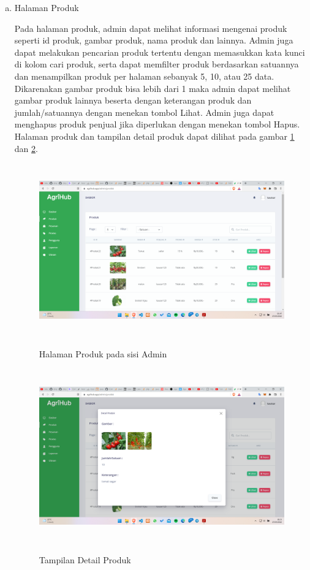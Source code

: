 \begin{enumerate}
\begin{enumerate}[a.]
		\item Halaman Produk
		\par Pada halaman produk, admin dapat melihat informasi mengenai produk seperti id produk, gambar produk, nama produk dan lainnya. Admin juga dapat melakukan pencarian produk tertentu dengan memasukkan kata kunci di kolom cari produk, serta dapat memfilter produk berdasarkan satuannya dan menampilkan produk per halaman sebanyak 5, 10, atau 25 data. Dikarenakan gambar produk bisa lebih dari 1 maka admin dapat melihat gambar produk lainnya beserta dengan keterangan produk dan jumlah/satuannya dengan menekan tombol Lihat. Admin juga dapat menghapus produk penjual jika diperlukan dengan menekan tombol Hapus. Halaman produk dan tampilan detail produk dapat dilihat pada gambar \ref*{produk_admin} dan \ref*{lihat_produk_admin}.
		\begin{figure}[H]
			\centering
			{\includegraphics [width = 13cm, height= 7.5cm]{gambar/admin/produk_admin}}
			\caption{Halaman Produk pada sisi Admin}
			\label{produk_admin}
		\end{figure}
		\begin{figure}[H]
			\centering
			{\includegraphics [width = 13cm, height= 7.5cm]{gambar/admin/lihat_produk_admin}}
			\caption{Tampilan Detail Produk}
			\label{lihat_produk_admin}
		\end{figure}


\end{enumerate}
\end{enumerate}
